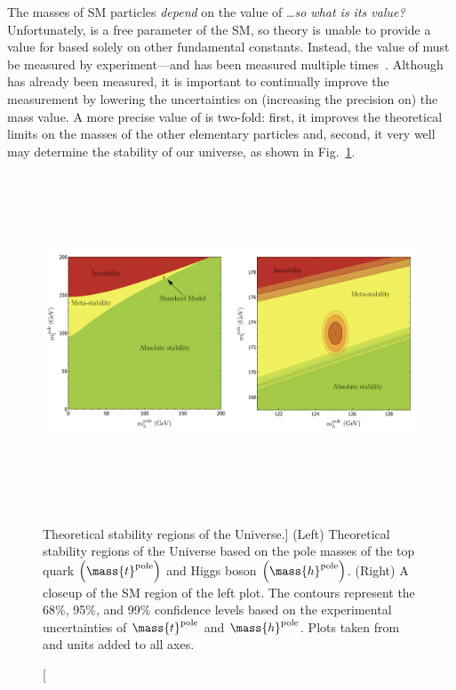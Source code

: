 The masses of SM particles \emph{depend} on the value of \mH\dots \emph{so what is its value?}
Unfortunately, \mH is a free parameter of the SM, so theory is unable to provide a value for \mH based solely on other fundamental constants.
Instead, the value of \mH must be measured by experiment---and has been measured multiple times~\cite{PhysRevLett.114.191803, sirunyan_measurement_2020, aaboud_measurement_2018}.
Although \mH has already been measured, it is important to continually improve the measurement by lowering the uncertainties on (\ie increasing the precision on) the mass value.
A more precise value of \mH is two-fold:
first, it improves the theoretical limits on the masses of the other elementary particles and, second, it very well may determine the stability of our universe, as shown in Fig.~\ref{fig:universe_stability}.
\begin{figure}[hbtp]
    \centering
    \includegraphics[width=15cm,height=10cm,keepaspectratio]{figures/intro/mtop_vs_mH_universestability.png}
        \caption
        [Theoretical stability regions of the Universe.]
        {
            (Left) Theoretical stability regions of the Universe based on the pole masses of the top quark $\left( \mass{t}^\text{pole} \right)$ and Higgs boson $\left( \mass{h}^\text{pole} \right)$.
            (Right) A closeup of the SM region of the left plot.
            The contours represent the 68\%, 95\%, and 99\% confidence levels based on the experimental uncertainties of $\mass{t}^\text{pole}$ and $\mass{h}^\text{pole}$.
            Plots taken from~\cite{univ_stab} and units added to all axes.
        }
        \label{fig:universe_stability}
\end{figure}


